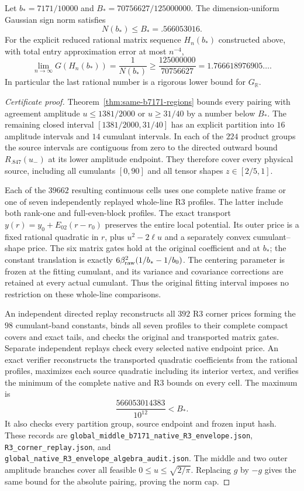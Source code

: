 \begin{theorem}
\label{thm:global-b7171-norm}
Let $b_*=7171/10000$ and $B_*=70756627/125000000$.
The dimension-uniform Gaussian sign norm satisfies
\[
 N(b_*)\le B_*=.566053016.
\]
For the explicit reduced rational matrix sequence $H_n(b_*)$
constructed above, with total entry approximation error at most
$n^{-4}$,
\[
 \lim_{n\to\infty}G(H_n(b_*))
 =\frac1{N(b_*)}
 \ge\frac{125000000}{70756627}
 =1.766618976905\ldots .
\]
In particular the last rational number is a rigorous lower bound for
$G_{\mathbb R}$.
\end{theorem}
\begin{proof}[Certificate proof]
Theorem~\ref{thm:same-b7171-regions} bounds every pairing with
agreement amplitude $u\le1381/2000$ or $u\ge31/40$ by a number below
$B_*$.  The remaining closed interval $[1381/2000,31/40]$ has an
explicit partition into $16$ amplitude intervals and $14$ cumulant
intervals.  In each of the $224$ product groups the source intervals
are contiguous from zero to the directed outward bound
$R_{.847}(u_-)$ at its lower amplitude endpoint.  They therefore
cover every physical source, including all cumulants $[0,90]$ and
all tensor shapes $z\in[2/5,1]$.

Each of the $39662$ resulting continuous cells uses one complete
native frame or one of seven independently replayed whole-line
R3 profiles.  The latter include both rank-one and full-even-block
profiles.  The exact transport $y(r)=y_0+E_{02}(r-r_0)$ preserves
the entire local potential.  Its outer price is a fixed rational
quadratic in $r$, plus $u^2-2\ell u$ and a separately convex
cumulant--shape price.  The six matrix gates hold at the original
coefficient and at $b_*$; the constant translation is exactly
$6\beta_{\rm raw}^2(1/b_*-1/b_0)$.
The centering parameter is frozen at the fitting cumulant, and its
variance and covariance corrections are retained at every actual
cumulant.  Thus the original fitting interval imposes no restriction
on these whole-line comparisons.

An independent directed replay reconstructs all $392$ R3 corner
prices forming the $98$ cumulant-band constants, binds all seven
profiles to their complete compact covers and exact tails, and
checks the original and transported matrix gates.  Separate
independent replays check every selected native endpoint price.
An exact verifier reconstructs the transported quadratic
coefficients from the rational profiles, maximizes each source
quadratic including its interior vertex, and verifies the minimum
of the complete native and R3 bounds on every cell.  The maximum is
\[
 \frac{566053014383}{10^{12}}<B_*.
\]
It also checks every partition group, source endpoint and frozen
input hash.  These records are
\texttt{global\_middle\_b7171\_native\_R3\_envelope.json},
\texttt{R3\_corner\_replay.json}, and
\texttt{global\_native\_R3\_envelope\_algebra\_audit.json}.
The middle and two outer amplitude branches cover all feasible
$0\le u\le\sqrt{2/\pi}$.  Replacing $g$ by $-g$ gives the same bound
for the absolute pairing, proving the norm cap.


\end{proof}
